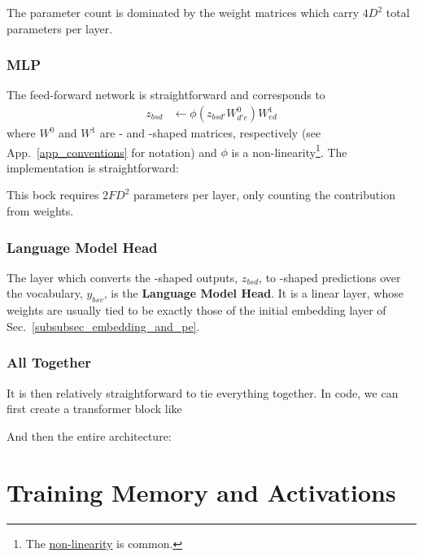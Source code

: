 \documentclass[11pt]{article}
\begin{document}
The parameter count is dominated by the weight matrices which carry $ 4 D ^{ 2 } $ total parameters per layer.


\subsubsection{MLP \label{subsubsec_mlp} }

The feed-forward network is straightforward and corresponds to
\begin{align}
  z _{ bsd } &\leftarrow \phi \left ( z _{ bsd' }W ^{ 0 }_{ d'e } \right ) W ^{ 1 } _{ ed }
\end{align}
where $ W ^{ 0 } $ and $ W ^{ 1 } $ are - and -shaped matrices,
respectively (see App.~\ref{app_conventions} for notation) and $ \phi $ is a
non-linearity\footnote{The 
\href{https://pytorch.org/docs/stable/generated/torch.nn.GELU.html}{non-linearity} is common.}. The
implementation is straightforward: 

This bock requires $ 2 F D ^{ 2 } $ parameters per layer, only counting the contribution from
weights.


\subsubsection{Language Model Head \label{subsubsec_language_model_head} }


The layer which converts the -shaped outputs, $ z _{ bsd } $, to -shaped
predictions over the vocabulary, $  y _{ bsv } $, is the \textbf{Language Model Head}. It
is a linear layer, whose weights are usually tied to be exactly those of the initial embedding
layer of Sec.~\ref{subsubsec_embedding_and_pe}.


\subsubsection{All Together}
It is then relatively straightforward to tie everything together.  In code, we can first create a
transformer block like

And then the entire architecture: 

\section{Training Memory and Activations }
\end{document}
